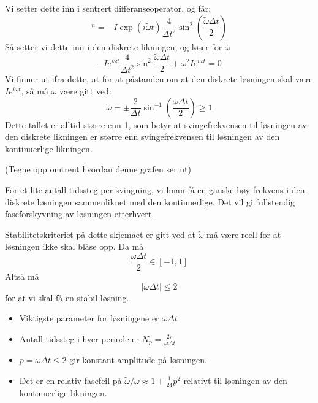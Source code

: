 \documentclass[a4paper, 10pt]{article}
\begin{document}
Vi setter dette inn i sentrert differanseoperator, og får:
\begin{equation}
	[D_t D_t u]^n = -I\exp{(i\tilde\omega t)}\frac{4}{\Delta t^2}\sin^2(\frac{\tilde\omega\Delta t}{2})
\end{equation}
Så setter vi dette inn i den diskrete likningen, og løser for  $\tilde{\omega}$
\begin{equation}
	-I e^{i\tilde{\omega}t}\frac{4}{\Delta t^2}\sin^2{\frac{\tilde{\omega}\Delta t}{2}} + \omega^2 Ie^{i\tilde{\omega}t} = 0
\end{equation}
Vi finner ut ifra dette, at for at påstanden om at den diskrete løsningen skal være $I e^{i\tilde{\omega}t}$, så må $\tilde{\omega}$ være gitt ved:
\begin{equation}
	\tilde{\omega} = \pm \frac{2}{\Delta t} \sin^{-1} \left(\frac{\omega\Delta t}{2}\right) \geq 1
\end{equation}
Dette tallet er alltid større enn 1, som betyr at svingefrekvensen til løsningen av den diskrete likningen er større enn svingefrekvensen til løsningen av den kontinuerlige likningen.

(Tegne opp omtrent hvordan denne grafen ser ut)

For et lite antall tidssteg per svingning, vi lman få en ganske høy frekvens i den diskrete løsningen sammenliknet med den kontinuerlige. Det vil gi fullstendig faseforskyvning av løsningen etterhvert.

Stabilitetskriteriet på dette skjemaet er gitt ved at $\tilde{\omega}$ må være reell for at løsningen ikke skal blåse opp. Da må
\begin{equation}
	\frac{\omega\Delta t}{2} \in [-1, 1]
\end{equation}
Altså må
\begin{equation}
	|\omega \Delta t| \leq 2
\end{equation}
for at vi skal få en stabil løsning.

\begin{itemize}
\item Viktigste parameter for løsningene er $\omega \Delta t$
\item Antall tidssteg i hver periode er $N_p = \frac{2\pi }{\omega \Delta t}$
\item $p=\omega \Delta t \leq 2$ gir konstant amplitude på løsningen.
\item Det er en relativ fasefeil på $\tilde{\omega}/\omega \approx 1 + \frac{1}{24}p^2$ relativt til løsningen av den kontinuerlige likningen.  
\end{itemize}
\end{document}
